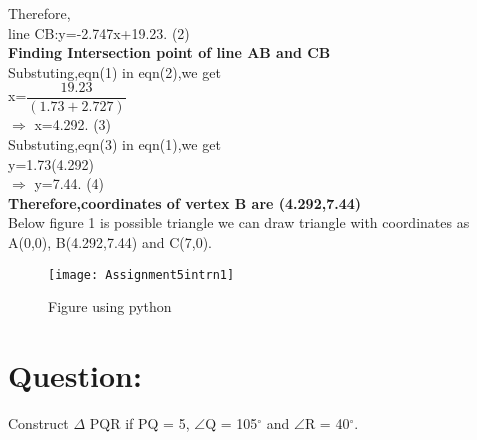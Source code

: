 \documentclass[a4paper,12pt]{article}
\begin{document}
Therefore,\\

\hspace*{0.5cm}line CB:y=-2.747x+19.23.   \hspace*{2.5cm}(2) \\

\pagebreak
\textbf{Finding Intersection point of line AB and CB}\\

Substuting,eqn(1) in eqn(2),we get\\

x=$\dfrac{19.23}{(1.73+2.727)}$\\

$\Rightarrow$ x=4.292.\hspace*{3cm} (3)\\

Substuting,eqn(3) in eqn(1),we get\\

y=1.73(4.292)\\

$\Rightarrow$ y=7.44.\hspace*{3cm} (4)\\

\textbf{Therefore,coordinates of vertex B are (4.292,7.44)}\\

Below figure 1 is possible triangle we can draw triangle with coordinates
\hspace*{0.5cm} as A(0,0), B(4.292,7.44) and C(7,0).\\

\vspace*{1cm} 
 
\begin{figure}[h]
\centering
\texttt{[image: Assignment5intrn1]}
\caption{Figure using python}
\end{figure}

\pagebreak

\section*{\small Question:}
Construct $\Delta$ PQR if PQ = 5, $\angle$Q = 105$^{\circ}$ and $\angle$R = 40$^{\circ}$.
\end{document}
